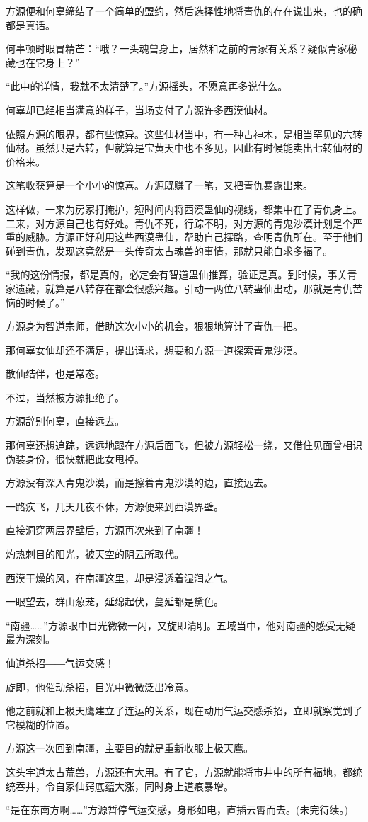 \begin{this_body}
方源便和何辜缔结了一个简单的盟约，然后选择性地将青仇的存在说出来，也的确都是真话。

何辜顿时眼冒精芒：“哦？一头魂兽身上，居然和之前的青家有关系？疑似青家秘藏也在它身上？”

“此中的详情，我就不太清楚了。”方源摇头，不愿意再多说什么。

何辜却已经相当满意的样子，当场支付了方源许多西漠仙材。

依照方源的眼界，都有些惊异。这些仙材当中，有一种古神木，是相当罕见的六转仙材。虽然只是六转，但就算是宝黄天中也不多见，因此有时候能卖出七转仙材的价格来。

这笔收获算是一个小小的惊喜。方源既赚了一笔，又把青仇暴露出来。

这样做，一来为房家打掩护，短时间内将西漠蛊仙的视线，都集中在了青仇身上。二来，对方源自己也有好处。青仇不死，行踪不明，对方源的青鬼沙漠计划是个严重的威胁。方源正好利用这些西漠蛊仙，帮助自己探路，查明青仇所在。至于他们碰到青仇，发现这竟然是一头传奇太古魂兽的事情，那就只能自求多福了。

“我的这份情报，都是真的，必定会有智道蛊仙推算，验证是真。到时候，事关青家遗藏，就算是八转存在都会很感兴趣。引动一两位八转蛊仙出动，那就是青仇苦恼的时候了。”

方源身为智道宗师，借助这次小小的机会，狠狠地算计了青仇一把。

那何辜女仙却还不满足，提出请求，想要和方源一道探索青鬼沙漠。

散仙结伴，也是常态。

不过，当然被方源拒绝了。

方源辞别何辜，直接远去。

那何辜还想追踪，远远地跟在方源后面飞，但被方源轻松一绕，又借住见面曾相识伪装身份，很快就把此女甩掉。

方源没有深入青鬼沙漠，而是擦着青鬼沙漠的边，直接远去。

一路疾飞，几天几夜不休，方源便来到西漠界壁。

直接洞穿两层界壁后，方源再次来到了南疆！

灼热刺目的阳光，被天空的阴云所取代。

西漠干燥的风，在南疆这里，却是浸透着湿润之气。

一眼望去，群山葱茏，延绵起伏，蔓延都是黛色。

“南疆……”方源眼中目光微微一闪，又旋即清明。五域当中，他对南疆的感受无疑最为深刻。

仙道杀招――气运交感！

旋即，他催动杀招，目光中微微泛出冷意。

他之前就和上极天鹰建立了连运的关系，现在动用气运交感杀招，立即就察觉到了它模糊的位置。

方源这一次回到南疆，主要目的就是重新收服上极天鹰。

这头宇道太古荒兽，方源还有大用。有了它，方源就能将市井中的所有福地，都统统吞并，令自家仙窍底蕴大涨，同时身上道痕暴增。

“是在东南方啊……”方源暂停气运交感，身形如电，直插云霄而去。(未完待续。)

\end{this_body}

